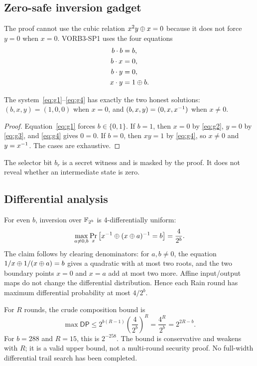 \documentclass[11pt,a4paper]{article}
\begin{document}
\subsection{Zero-safe inversion gadget}

The proof cannot use the cubic relation $x^2y\oplus x=0$ because it does not
force $y=0$ when $x=0$. VORB3-SP1 uses the four equations
\begin{align}
b\cdot b&=b,\label{eq:g1}\\
b\cdot x&=0,\label{eq:g2}\\
b\cdot y&=0,\label{eq:g3}\\
x\cdot y&=1\oplus b.\label{eq:g4}
\end{align}

\begin{lemma}
The system~\eqref{eq:g1}--\eqref{eq:g4} has exactly the two honest solutions:
$(b,x,y)=(1,0,0)$ when $x=0$, and $(b,x,y)=(0,x,x^{-1})$ when $x\ne0$.
\end{lemma}
\begin{proof}
Equation~\eqref{eq:g1} forces $b\in\{0,1\}$. If $b=1$, then $x=0$ by
\eqref{eq:g2}, $y=0$ by \eqref{eq:g3}, and \eqref{eq:g4} gives $0=0$. If
$b=0$, then $xy=1$ by \eqref{eq:g4}, so $x\ne0$ and $y=x^{-1}$. The cases are
exhaustive.
\end{proof}

The selector bit $b_r$ is a secret witness and is masked by the proof. It does
not reveal whether an intermediate state is zero.

\subsection{Differential analysis}

For even $b$, inversion over $\mathbb{F}_{2^{b}}$ is 4-differentially uniform:
\[
\max_{a\ne0,b}\Pr_{x}\left[x^{-1}\oplus(x\oplus a)^{-1}=b\right]=\frac{4}{2^b}.
\]
The claim follows by clearing denominators: for $a,b\ne0$, the equation
$1/x\oplus1/(x\oplus a)=b$ gives a quadratic with at most two roots, and the two
boundary points $x=0$ and $x=a$ add at most two more. Affine input/output maps
do not change the differential distribution. Hence each Rain round has
maximum differential probability at most $4/2^b$.

For $R$ rounds, the crude composition bound is
\[
\max\mathsf{DP}\le 2^{b(R-1)}\left(\frac{4}{2^b}\right)^R
=\frac{4^R}{2^b}=2^{2R-b}.
\]
For $b=288$ and $R=15$, this is $2^{-258}$. The bound is conservative and
weakens with $R$; it is a valid upper bound, not a multi-round security proof.
No full-width differential trail search has been completed.
\end{document}

